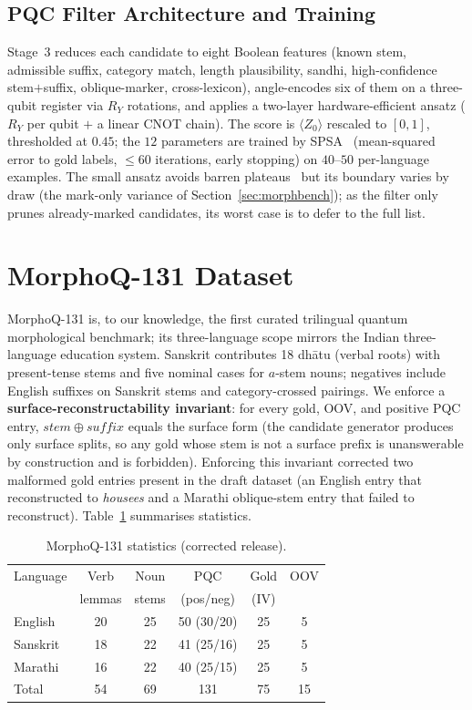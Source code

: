 \documentclass[journal]{IEEEtran}
\begin{document}
\subsection{PQC Filter Architecture and Training}
\label{sec:pqc}
Stage~3 reduces each candidate to eight Boolean features (known stem, admissible
suffix, category match, length plausibility, sandhi, high-confidence
stem$+$suffix, oblique-marker, cross-lexicon), angle-encodes six of them on a
three-qubit register via $R_Y$ rotations, and applies a two-layer
hardware-efficient ansatz ($R_Y$ per qubit $+$ a linear CNOT chain). The score is
$\langle Z_0\rangle$ rescaled to $[0,1]$, thresholded at $0.45$; the $12$
parameters are trained by SPSA~\cite{spall1992} (mean-squared error to gold labels,
$\le60$ iterations, early stopping) on $40$--$50$ per-language examples. The small
ansatz avoids barren plateaus~\cite{mcclean2018} but its boundary varies by draw
(the mark-only variance of Section~\ref{sec:morphbench}); as the filter only
prunes already-marked candidates, its worst case is to defer to the full list.

\section{MorphoQ-131 Dataset}
\label{sec:dataset}
MorphoQ-131 is, to our knowledge, the first curated trilingual quantum
morphological benchmark; its three-language scope mirrors the Indian
three-language education system. Sanskrit contributes 18 dh\={a}tu (verbal
roots) with present-tense stems and five nominal cases for $a$-stem nouns;
negatives include English suffixes on Sanskrit stems and category-crossed
pairings. We enforce a \textbf{surface-reconstructability invariant}: for every
gold, OOV, and positive PQC entry, $stem \oplus suffix$ equals the surface form
(the candidate generator produces only surface splits, so any gold whose stem is
not a surface prefix is unanswerable by construction and is forbidden).
Enforcing this invariant corrected two malformed gold entries present in the
draft dataset (an English entry that reconstructed to \emph{housees} and a
Marathi oblique-stem entry that failed to reconstruct). Table~\ref{tab:dataset}
summarises statistics.

\begin{table}[t]
\centering
\caption{MorphoQ-131 statistics (corrected release).}
\label{tab:dataset}
\small
\begin{tabular}{@{}lccccc@{}}
\toprule
Language & Verb & Noun & PQC & Gold & OOV \\
         & lemmas & stems & (pos/neg) & (IV) & \\
\midrule
English  & 20 & 25 & 50 (30/20) & 25 & 5 \\
Sanskrit & 18 & 22 & 41 (25/16) & 25 & 5 \\
Marathi  & 16 & 22 & 40 (25/15) & 25 & 5 \\
\midrule
Total    & 54 & 69 & 131 & 75 & 15 \\
\bottomrule
\end{tabular}
\end{table}
\end{document}
